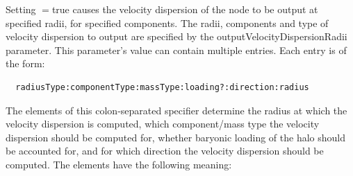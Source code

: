 Setting {\normalfont \ttfamily [outputVelocityDispersionData]}$=${\normalfont \ttfamily true} causes the velocity dispersion of the node to be output at specified radii, for specified components. The radii, components and type of velocity dispersion to output are specified by the {\normalfont \ttfamily outputVelocityDispersionRadii} parameter. This parameter's value can contain multiple entries. Each entry is of the form:
\begin{verbatim}
  radiusType:componentType:massType:loading?:direction:radius
\end{verbatim}
The elements of this colon-separated specifier determine the radius at which the velocity dispersion is computed, which component/mass type the velocity dispersion should be computed for, whether baryonic loading of the halo should be accounted for, and for which direction the velocity dispersion should be computed. The elements have the following meaning:
